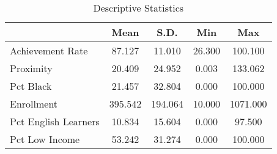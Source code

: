 \begin{table}[h]
\centering
\caption{Descriptive Statistics} 
\begin{tabular}{|l|c|c|c|c|}
  \hline
 & Mean & S.D. & Min & Max \\ 
  \hline
Achievement Rate & 87.127 & 11.010 & 26.300 & 100.100 \\ 
   \hline
Proximity & 20.409 & 24.952 & 0.003 & 133.062 \\ 
   \hline
Pct Black & 21.457 & 32.804 & 0.000 & 100.000 \\ 
   \hline
Enrollment & 395.542 & 194.064 & 10.000 & 1071.000 \\ 
   \hline
Pct English Learners & 10.834 & 15.604 & 0.000 & 97.500 \\ 
   \hline
Pct Low Income & 53.242 & 31.274 & 0.000 & 100.000 \\ 
   \hline
\end{tabular}
\end{table}
